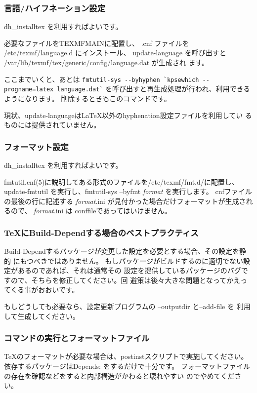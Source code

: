\documentclass[mingoth,a4paper]{jsarticle}
\begin{document}
\subsubsection{言語/ハイフネーション設定}

dh\_{}installtex を利用すればよいです。

必要なファイルをTEXMFMAINに配置し、
.cnf ファイルを /etc/texmf/language.d にインストール、 update-language
を呼び出すと /var/lib/texmf/tex/generic/config/language.dat が生成され
ます。

ここまでいくと、あとは
\verb!fmtutil-sys --byhyphen `kpsewhich --progname=latex language.dat`!
を呼び出すと再生成処理が行われ、利用できるようになります。
削除するときもこのコマンドです。

現状、update-languageは\LaTeX{}以外のhyphenation設定ファイルを利用してい
るものには提供されていません。

\subsubsection{フォーマット設定}

dh\_{}installtex を利用すればよいです。

fmtutil.cnf(5)に説明してある形式のファイルを/etc/texmf/fmt.d/に配置し、
 update-fmtutil を実行し、fmtutil-sys --byfmt {\it format} を実行します。
cnfファイルの最後の行に記述する {\it format}.ini が見付かった場合だけフォーマットが生成されるので、
 {\it format}.ini は conffileであってはいけません。

\subsubsection{TeXにBuild-Dependする場合のベストプラクティス}

Build-Dependするパッケージが変更した設定を必要とする場合、その設定を静的
にもつべきではありません。
もしパッケージがビルドするのに適切でない設定があるのであれば、それは通常その
設定を提供しているパッケージのバグですので、そちらを修正してください。回
避策は後々大きな問題となってかえってくる事がおおいです。

もしどうしても必要なら、設定更新プログラムの --outputdir と--add-file を
利用して生成してください。


\subsubsection{コマンドの実行とフォーマットファイル}

\TeX{}のフォーマットが必要な場合は、postinstスクリプトで実施してください。
依存するパッケージはDepends: をするだけで十分です。
フォーマットファイルの存在を確認などをすると内部構造がかわると壊れやすい
のでやめてください。
\end{document}
